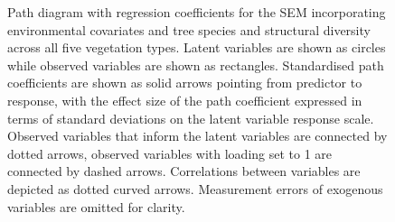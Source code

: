 \documentclass[11pt,a4paper]{article}
\begin{document}
\begin{figure}[H]
\centering
	
	\caption{Path diagram with regression coefficients for the SEM incorporating environmental covariates and tree species and structural diversity across all five vegetation types. Latent variables are shown as circles while observed variables are shown as rectangles. Standardised path coefficients are shown as solid arrows pointing from predictor to response, with the effect size of the path coefficient expressed in terms of standard deviations on the latent variable response scale. Observed variables that inform the latent variables are connected by dotted arrows, observed variables with loading set to 1 are connected by dashed arrows. Correlations between variables are depicted as dotted curved arrows. Measurement errors of exogenous variables are omitted for clarity.}
	\label{full_mod}
\end{figure}


% 
% 
% 
% 
\end{document}
